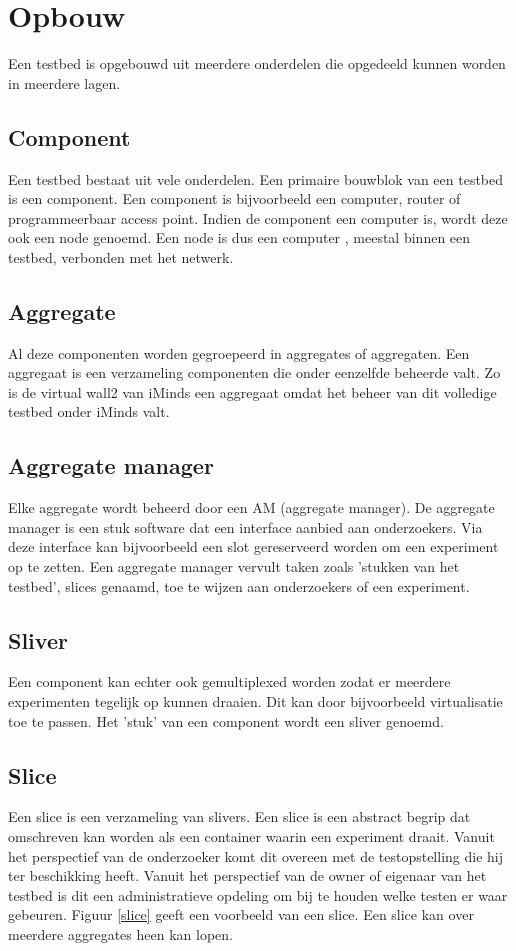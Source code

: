 \section{Opbouw}
Een testbed is opgebouwd uit meerdere onderdelen die opgedeeld kunnen worden in meerdere lagen.
\subsection{Component}
\npar
Een testbed bestaat uit vele onderdelen. Een primaire bouwblok van een testbed is een component. Een component is bijvoorbeeld een computer, router of programmeerbaar access point. Indien de component een computer is, wordt deze ook een node genoemd. Een node is dus een computer , meestal binnen een testbed, verbonden met het netwerk. 
\subsection{Aggregate}
\npar
Al deze componenten worden gegroepeerd in aggregates of aggregaten. Een aggregaat is een verzameling componenten die onder eenzelfde beheerde valt. Zo is de virtual wall2 van iMinds een aggregaat omdat het beheer van dit volledige testbed onder iMinds valt.
\clearpage
\subsection{Aggregate manager}
\npar
Elke aggregate wordt beheerd door een AM (aggregate manager). De aggregate manager is een stuk software dat een interface aanbied aan onderzoekers. Via deze interface kan bijvoorbeeld een slot gereserveerd worden om een experiment op te zetten. Een aggregate manager vervult taken zoals 'stukken van het testbed', slices genaamd, toe te wijzen aan onderzoekers of een experiment.
\subsection{Sliver}
\npar
Een component kan echter ook gemultiplexed worden zodat er meerdere experimenten tegelijk op kunnen draaien. Dit kan door bijvoorbeeld virtualisatie toe te passen. Het 'stuk' van een component wordt een sliver genoemd.
\subsection{Slice}
\npar
Een slice is een verzameling van slivers. Een slice is een abstract begrip dat omschreven kan worden als een container waarin een experiment draait. Vanuit het perspectief van de onderzoeker komt dit overeen met de testopstelling die hij ter beschikking heeft. Vanuit het perspectief van de owner of eigenaar van het testbed is dit een administratieve opdeling om bij te houden welke testen er waar gebeuren. Figuur \ref{slice} geeft een voorbeeld van een slice. Een slice kan over meerdere aggregates heen kan lopen.
\clearpage
